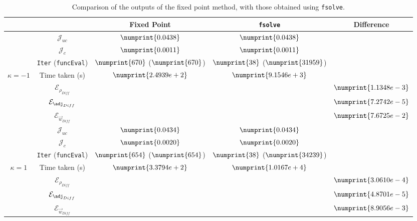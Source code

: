 \begin{table}
\begin{tabular}{ | c | c || c | c | c ||}
\hline
\multicolumn{2}{|c||}{} & Fixed Point & \texttt{fsolve} & Difference   \\
\hline
\hline
 & $\mathcal{J}_{uc}$ & $\numprint{0.0438}$ & $\numprint{0.0438}$ &   \\
 & $\mathcal{J}_{c}$ & $\numprint{0.0011}$ & $\numprint{0.0011}$ &   \\
 & \texttt{Iter} (\texttt{funcEval}) & $\numprint{670}$ ($\numprint{670}$)  & $\numprint{38}$ ($\numprint{31959}$)  &   \\
$\kappa =-1$ & Time taken (s) & $\numprint{2.4939e+2}$ & $\numprint{9.1546e+3}$ &   \\
 & $\mathcal{E}_{\rho_{Diff}}$ & & &$\numprint{1.1348e-3}$  \\
 & $\mathcal{E}_{\adj_{Diff}}$ & & &$\numprint{7.2742e-5}$  \\
 & $\mathcal{E}_{\vec{w}_{Diff}}$ & & & $\numprint{7.6725e-2}$  \\
\hline
 & $\mathcal{J}_{uc}$ & $\numprint{0.0434}$ & $\numprint{0.0434}$ &   \\
 & $\mathcal{J}_{c}$ & $\numprint{0.0020}$ & $\numprint{0.0020}$ &   \\
 & \texttt{Iter} (\texttt{funcEval}) & $\numprint{654}$ ($\numprint{654}$)  & $\numprint{38}$ ($\numprint{34239}$)  &   \\
$\kappa =1$ & Time taken (s) & $\numprint{3.3794e+2}$ & $\numprint{1.0167e+4}$ &   \\
 & $\mathcal{E}_{\rho_{Diff}}$ & & &$\numprint{3.0610e-4}$  \\
 & $\mathcal{E}_{\adj_{Diff}}$ & & &$\numprint{4.8701e-5}$  \\
 & $\mathcal{E}_{\vec{w}_{Diff}}$ & & & $\numprint{8.9056e-3}$  \\
\hline
\end{tabular}
\caption{Comparison of the outputs of the fixed point method, with those obtained using \texttt{fsolve}.}
\label{TabA3:Prob1}
\end{table}